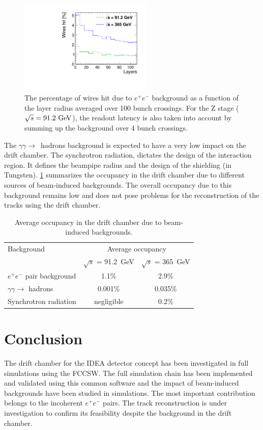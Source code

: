 \documentclass[conference]{IEEEtran}
\begin{document}
\begin{figure}[!t]
\centering
\includegraphics[width=2.5in]{Poster/Figures/incoherent_top_Z.pdf}
\caption{The percentage of wires hit due to $e^+e^-$ background as a function of the layer radius averaged over 100 bunch crossings. For the Z stage ($\sqrt{s} = 91.2\,\mathrm{\,Ge\kern -0.1em V}$), the readout latency is also taken into account by summing up the background over 4 bunch crossings.}
\label{fig_simhitspercent}
\end{figure}


The $\gamma\gamma\rightarrow$~hadrons background is expected to have a very low impact on the drift chamber. The synchrotron radiation, dictates the design of the interaction region. It defines the beampipe radius and the design of the shielding (in Tungsten).
\cref{occupancy_DCH} summarizes the occupancy in the drift chamber due to different sources of beam-induced backgrounds. The overall occupancy due to this background remains low and does not pose problems for the reconstruction of the tracks using the drift chamber.



\begin{table}[!t]
	\renewcommand{\arraystretch}{1.3}
	\caption{Average occupancy in the drift chamber due to beam-induced backgrounds.}
	\label{occupancy_DCH}
	\centering
	\begin{tabular}{l c c}
		\toprule
		 Background & \multicolumn{2}{c}{Average occupancy} \\
			& $\sqrt{s}$ = 91.2~GeV & $\sqrt{s}$ = 365~GeV \\
		 \midrule
		 $e^+e^-$ pair background & 1.1\% & 2.9\% \\
		 $\gamma\gamma\rightarrow$ hadrons & 0.001\% & 0.035\%  \\
		 Synchrotron radiation & negligible & 0.2\% \\
		 \bottomrule
	\end{tabular}
\end{table}

\section{Conclusion}
The drift chamber for the IDEA detector concept has been investigated in full simulations using the FCCSW. The full simulation chain has been implemented and validated using this common software and the impact of beam-induced backgrounds have been studied in simulations. The most important contribution belongs to the incoherent $e^+e^-$ pairs. The track reconstruction is under investigation to confirm its feasibility despite the background in the drift chamber.
\end{document}
